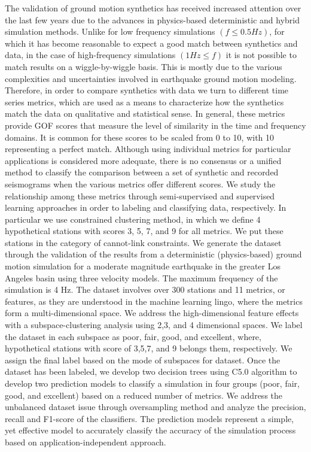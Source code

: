 % 
The validation of ground motion synthetics has received increased attention over the last few years due to the advances in physics-based deterministic and hybrid simulation methods. Unlike for low frequency simulations $(f \le 0.5 Hz)$, for which it has become reasonable to expect a good match between synthetics and data, in the case of high-frequency simulations $(1 Hz \le f)$ it is not possible to match results on a wiggle-by-wiggle basis. This is mostly due to the various complexities and uncertainties involved in earthquake ground motion modeling. Therefore, in order to compare synthetics with data we turn to different time series metrics, which are used as a means to characterize how the synthetics match the data on qualitative and statistical sense. In general, these metrics provide GOF scores that measure the level of similarity in the time and frequency domains. It is common for these scores to be scaled from 0 to 10, with 10 representing a perfect match. Although using individual metrics for particular applications is considered more adequate, there is no consensus or a unified method to classify the comparison between a set of synthetic and recorded seismograms when the various metrics offer different scores. We study the relationship among these metrics through 
semi-supervised and supervised learning approaches in order to labeling and classifying data, respectively. In particular we use constrained \kmeans{} clustering method, in which we define 4 hypothetical stations with scores 3, 5, 7, and 9 for all metrics. We put these stations in the category of cannot-link constraints. We generate the dataset through the validation of the results from a deterministic (physics-based) ground motion simulation for a moderate magnitude earthquake in the greater Los Angeles basin using three velocity models. The maximum frequency of the simulation is 4 Hz. The dataset involves over 300 stations and 11 metrics, or features, as they are understood in the machine learning lingo, where the metrics form a multi-dimensional space. We address the high-dimensional feature effects with a subspace-clustering analysis using 2,3, and 4 dimensional spaces. We label the dataset in each subspace as poor, fair, good, and excellent, where, hypothetical stations with score of 3,5,7, and 9 belongs them, respectively. We assign the final label based on the mode of subspaces for dataset.  Once the dataset has been labeled, we develop two decision trees using C5.0 algorithm to develop two prediction models to classify a simulation in four groups (poor, fair, good, and excellent) based on a reduced number of metrics. We address the unbalanced dataset issue through oversampling method and analyze the precision, recall and F1-score of the classifiers. The prediction models represent a simple, yet effective model to accurately classify the accuracy of the simulation process based on application-independent approach.







